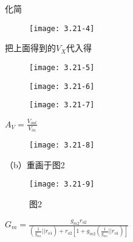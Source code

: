 化简

		\begin{figure}[H] %
	\begin{minipage}{\linewidth}
		\texttt{[image: 3.21-4]}
	\end{minipage}
\end{figure}

把上面得到的$V_X$代入得

		\begin{figure}[H] %
	\begin{minipage}{\linewidth}
		\texttt{[image: 3.21-5]}
	\end{minipage}
\end{figure}

		\begin{figure}[H] %
	\begin{minipage}{\linewidth}
		\texttt{[image: 3.21-6]}
	\end{minipage}
\end{figure}

		\begin{figure}[H] %
	\begin{minipage}{\linewidth}
		\texttt{[image: 3.21-7]}
	\end{minipage}
\end{figure}

$A_V=\frac{V_{out}}{V_{in}}$



\begin{figure}[H] %
	\begin{minipage}{\linewidth}
		\texttt{[image: 3.21-8]}
	\end{minipage}
\end{figure}

\scalebox{3}{（b）}

（b）重画于图2

\begin{figure}[H] %
	\begin{minipage}{\linewidth}
		\texttt{[image: 3.21-9]}
	\end{minipage}
	\caption*{图2} %
\end{figure}

$G_m=\frac{g_{m2}r_{o2}}{(\frac{1}{g_{m1}}||r_{o1})+r_{o2}[1+g_{m2}(\frac{1}{g_{m1}}||r_{o1})]}$


